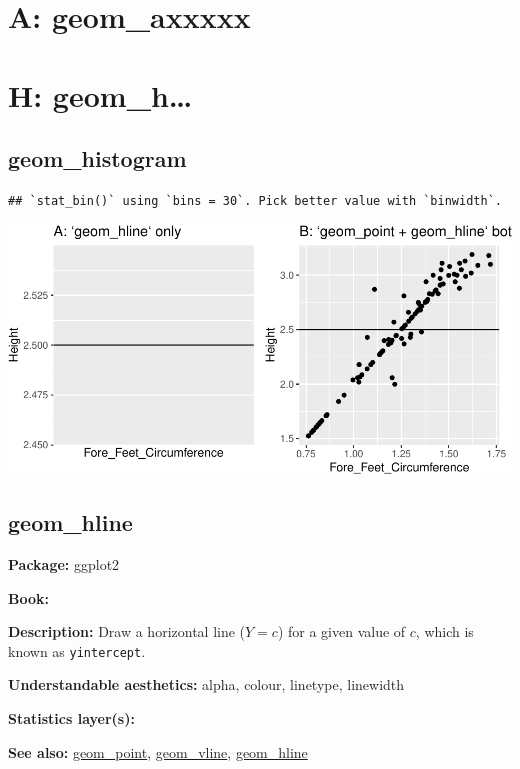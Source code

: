\documentclass[
]{book}
\begin{document}
\hypertarget{a-geom_axxxxx}{%
\chapter{A: geom\_axxxxx}\label{a-geom_axxxxx}}

\hypertarget{h-geom_h}{%
\chapter{H: geom\_h\ldots{}}\label{h-geom_h}}

\hypertarget{histogram}{%
\section{geom\_histogram}\label{histogram}}

\begin{verbatim}
## `stat_bin()` using `bins = 30`. Pick better value with `binwidth`.
\end{verbatim}

\includegraphics{Data-Visualisation-geom-Encyclopedia_files/figure-latex/unnamed-chunk-40-1.pdf}

\hypertarget{hline}{%
\section{geom\_hline}\label{hline}}

\textbf{Package: } ggplot2 \autocite{R-ggplot2}

\textbf{Book: }

\textbf{Description: } Draw a horizontal line (\(Y=c\)) for a given value of \(c\), which is known as \texttt{yintercept}.

\textbf{Understandable aesthetics:} alpha, colour, linetype, linewidth

\textbf{Statistics layer(s):}

\textbf{See also: } \protect\hyperlink{point}{geom\_point}, \protect\hyperlink{vline}{geom\_vline}, \protect\hyperlink{hline}{geom\_hline}
\end{document}
